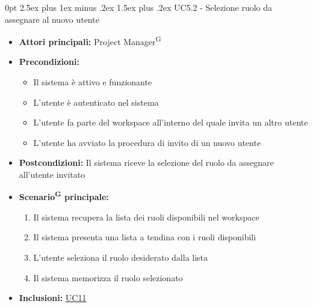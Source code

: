 \documentclass[a4paper, 11pt]{article}
\makeatletter
\renewcommand\paragraph{\@startsection{paragraph}{4}
  {0pt}
  {2.5ex plus 1ex minus .2ex}
  {1.5ex plus .2ex}
  {\normalfont\normalsize\bfseries\color{AccentDark}}}
\makeatother
\begin{document}
\paragraph{UC5.2 - Selezione ruolo da assegnare al nuovo utente}\label{UC5.2}
\begin{itemize}
	\item \textbf{Attori principali:} Project Manager\textsuperscript{G}
	\item \textbf{Precondizioni:} 
	\begin{itemize}
		\item Il sistema è attivo e funzionante
		\item L'utente è autenticato nel sistema
        \item L'utente fa parte del workspace all'interno del quale invita un altro utente
        \item L'utente ha avviato la procedura di invito di un nuovo utente
	\end{itemize}
    	\item \textbf{Postcondizioni:} Il sistema riceve la selezione del ruolo da assegnare all'utente invitato
	\item \textbf{Scenario\textsuperscript{G} principale:} 
    \begin{enumerate}
    \item Il sistema recupera la lista dei ruoli disponibili nel workspace
    \item Il sistema presenta una lista a tendina con i ruoli disponibili
    \item L'utente seleziona il ruolo desiderato dalla lista
    \item Il sistema memorizza il ruolo selezionato
    \end{enumerate}
    \item \textbf{Inclusioni:} \hyperref[UC11]{UC11}
\end{itemize}
\end{document}
